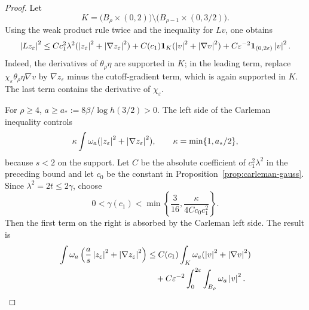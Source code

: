 \documentclass[11pt,letterpaper]{article}
\numberwithin{equation}{section}
\theoremstyle{plain}
\theoremstyle{definition}
\theoremstyle{remark}
\begin{document}
\begin{proof}
Let
\[
 K=\bigl(B_\rho\times(0,2)\bigr)
       \setminus\bigl(B_{\rho-1}\times(0,3/2)\bigr).
\]
Using the weak product rule twice and the inequality for $Lv$, one obtains
\[
 \left\lvert L z_\varepsilon\right\rvert^2\leq
 Cc_1^2\lambda^2(\left\lvert z_\varepsilon\right\rvert^2+
                         \left\lvert \nabla z_\varepsilon\right\rvert^2)
 +C(c_1)\mathbf 1_K(\left\lvert v\right\rvert^2+\left\lvert \nabla v\right\rvert^2)
 +C\varepsilon^{-2}\mathbf 1_{(0,2\varepsilon)}\left\lvert v\right\rvert^2.
\]
Indeed, the derivatives of $\theta_\rho\eta$ are supported in $K$;
in the leading term, replace
$\chi_\varepsilon\theta_\rho\eta\nabla v$ by
$\nabla z_\varepsilon$ minus the cutoff-gradient term, which is again
supported in $K$. The last term contains the derivative of
$\chi_\varepsilon$.

For $\rho\geq4$, $a\geq a_*:=8\beta/\log h(3/2)>0$. The left side of the
Carleman inequality controls
\[
 \kappa\int\omega_a(\left\lvert z_\varepsilon\right\rvert^2+
                         \left\lvert \nabla z_\varepsilon\right\rvert^2),
 \qquad \kappa=\min\{1,a_*/2\},
\]
because $s<2$ on the support. Let $C$ be the absolute coefficient of
$c_1^2\lambda^2$ in the preceding bound and let $c_0$ be the constant in
Proposition~\ref{prop:carleman-gauss}. Since $\lambda^2=2t\leq2\gamma$,
choose
\[
 0<\gamma(c_1)<\min\left\{\frac{3}{16},
                  \frac{\kappa}{4Cc_0c_1^2}\right\}.
\]
Then the first term on the right is absorbed by the Carleman left side. The
result is
\begin{align}
 \int\omega_a\left(\frac{a}{s}\left\lvert z_\varepsilon\right\rvert^2+
                              \left\lvert \nabla z_\varepsilon\right\rvert^2\right)
 &\leq C(c_1)\int_K\omega_a(\left\lvert v\right\rvert^2+\left\lvert \nabla v\right\rvert^2)\notag\\
 &\quad+C\varepsilon^{-2}
       \int_0^{2\varepsilon}\int_{B_\rho}\omega_a\left\lvert v\right\rvert^2.
 \label{eq:uc-cutoff-carleman}
\end{align}


\end{proof}
\end{document}
